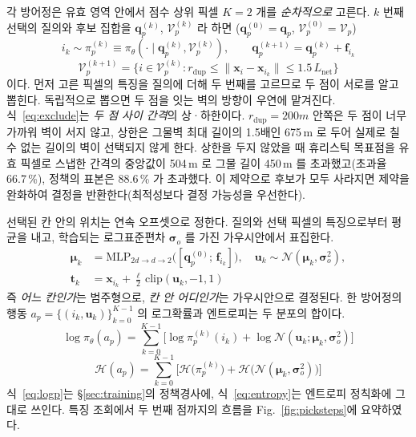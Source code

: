 각 방어정은 유효 영역 안에서 점수 상위 픽셀 $K=2$ 개를 \emph{순차적으로} 고른다. $k$ 번째
선택의 질의와 후보 집합을 $\mathbf{q}^{(k)}_p$, $\mathcal{V}^{(k)}_p$ 라 하면
($\mathbf{q}^{(0)}_p = \mathbf{q}_p$, $\mathcal{V}^{(0)}_p = \mathcal{V}_p$)
\begin{equation}
i_k \sim \pi^{(k)}_p \equiv \pi_\theta(\cdot \mid \mathbf{q}^{(k)}_p, \mathcal{V}^{(k)}_p), \qquad
\mathbf{q}^{(k+1)}_p = \mathbf{q}^{(k)}_p + \mathbf{f}_{i_k}
\label{eq:autoreg}
\end{equation}
\begin{equation}
\mathcal{V}^{(k+1)}_p = \big\{ i \in \mathcal{V}^{(k)}_p :
  r_{\mathrm{dup}} \le \lVert \mathbf{x}_i - \mathbf{x}_{i_k} \rVert \le 1.5\, L_{\mathrm{net}} \big\}
\label{eq:exclude}
\end{equation}
이다. 먼저 고른 픽셀의 특징을 질의에 더해 두 번째를 고르므로 두 점이 서로를 알고 뽑힌다.
독립적으로 뽑으면 두 점을 잇는 벽의 방향이 우연에 맡겨진다. 식~\eqref{eq:exclude}는
\emph{두 점 사이 간격}의 상·하한이다. $r_{\mathrm{dup}} = 200\unit{m}$ 안쪽은 두 점이 너무
가까워 벽이 서지 않고, 상한은 그물벽 최대 길이의 1.5배인 675\,m 로 두어 실제로 칠 수 없는
길이의 벽이 선택되지 않게 한다. 상한을 두지 않았을 때 휴리스틱 목표점을 유효 픽셀로 스냅한 간격의
중앙값이 504\,m 로 그물 길이 450\,m 를 초과했고(초과율 66.7\,\%), 정책의 표본은 88.6\,\% 가
초과했다. 이 제약으로 후보가 모두 사라지면 제약을
완화하여 결정을 반환한다(최적성보다 결정 가능성을 우선한다).

선택된 칸 안의 위치는 연속 오프셋으로 정한다. 질의와 선택 픽셀의 특징으로부터 평균을 내고,
학습되는 로그표준편차 $\boldsymbol{\sigma}_o$ 를 가진 가우시안에서 표집한다.
\begin{equation}
\begin{aligned}
\boldsymbol{\mu}_k &= \mathrm{MLP}_{2d \to d \to 2}\big([\mathbf{q}^{(0)}_p;\, \mathbf{f}_{i_k}]\big), \quad
\mathbf{u}_k \sim \mathcal{N}(\boldsymbol{\mu}_k, \boldsymbol{\sigma}_o^2),\\
\mathbf{t}_k &= \mathbf{x}_{i_k} + \tfrac{\ell}{2}\,\mathrm{clip}(\mathbf{u}_k, -1, 1)
\end{aligned}
\label{eq:offset}
\end{equation}
즉 \emph{어느 칸인가}는 범주형으로, \emph{칸 안 어디인가}는 가우시안으로 결정된다. 한
방어정의 행동 $a_p = \{(i_k, \mathbf{u}_k)\}_{k=0}^{K-1}$ 의 로그확률과 엔트로피는 두 분포의
합이다.
\begin{equation}
\log \pi_\theta(a_p) = \sum_{k=0}^{K-1} \Big[ \log \pi^{(k)}_p(i_k)
  + \log \mathcal{N}(\mathbf{u}_k; \boldsymbol{\mu}_k, \boldsymbol{\sigma}_o^2) \Big]
\label{eq:logp}
\end{equation}
\begin{equation}
\mathcal{H}(a_p) = \sum_{k=0}^{K-1} \Big[ \mathcal{H}\big(\pi^{(k)}_p\big)
  + \mathcal{H}\big(\mathcal{N}(\boldsymbol{\mu}_k, \boldsymbol{\sigma}_o^2)\big) \Big]
\label{eq:entropy}
\end{equation}
식~\eqref{eq:logp}는 \S\ref{sec:training}의 정책경사에, 식~\eqref{eq:entropy}는 엔트로피
정칙화에 그대로 쓰인다. 특징 조회에서 두 번째 점까지의 흐름을 Fig.~\ref{fig:picksteps}에
요약하였다.

